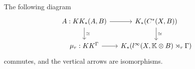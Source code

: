 \begin{thm}
The following diagram
\[\begin{tikzcd}[column sep = small]
A : KK_*(A,B)\arrow{r}\arrow{d}{\simeq} & K_*(C^*(X,B)) \arrow{d}{\simeq}\\
\mu_{r} : KK^\Gamma \arrow{r} & K_*(l^\infty(X,\K\otimes B)\rtimes_r \Gamma)
\end{tikzcd}\]
commutes, and the vertical arrows are isomorphisms.
\end{thm}



















